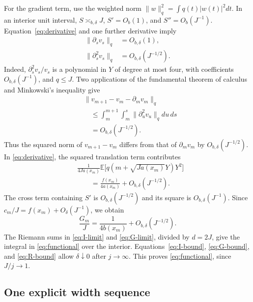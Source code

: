 \documentclass[aps,pra,reprint,superscriptaddress,longbibliography]{revtex4-2}
\theoremstyle{remark}
\newcommand{\E}{\mathbb E}
\newcommand{\norm}[1]{\lVert#1\rVert}
\begin{document}
For the gradient term, use the weighted norm
$\norm w_q^2=\int q(t)|w(t)|^2dt$. In an interior unit interval,
$S\asymp_{b,\delta}J$, $S'=O_b(1)$, and $S''=O_b(J^{-1})$.
Equation~\eqref{eq:derivative} and one further derivative imply
\begin{equation}
\begin{aligned}
\norm{\partial_sv_s}_q&=O_{b,\delta}(1),\\
\norm{\partial_s^2v_s}_q&=O_{b,\delta}(J^{-1/2}).
\end{aligned}
\label{eq:H2}
\end{equation}
Indeed, $\partial_s^2v_s/v_s$ is a polynomial in $Y$ of degree at
most four, with coefficients $O_{b,\delta}(J^{-1})$, and $q\leq J$.
Two applications of the fundamental theorem of calculus and
Minkowski's inequality give
\begin{equation}
\begin{aligned}
&\norm{v_{m+1}-v_m-\partial_mv_m}_q\\
&\quad\leq\int_m^{m+1}\int_m^s
\norm{\partial_u^2v_u}_qdu\,ds\\
&\quad=O_{b,\delta}(J^{-1/2}).
\end{aligned}
\label{eq:finite-diff}
\end{equation}
Thus the squared norm of $v_{m+1}-v_m$ differs from that of
$\partial_mv_m$ by $O_{b,\delta}(J^{-1/2})$.
In \eqref{eq:derivative}, the squared translation term contributes
\begin{align*}
 &\frac1{4Ja(x_m)}\E\bigl[q(m+\sqrt{Ja(x_m)}Y)Y^2\bigr]\\
 &\qquad=\frac{f(x_m)}{4a(x_m)}+O_{b,\delta}(J^{-1/2}).
\end{align*}
The cross term containing $S'$ is $O_{b,\delta}(J^{-1/2})$ and its
square is $O_{b,\delta}(J^{-1})$. Since
$c_m/J=f(x_m)+O_\delta(J^{-1})$, we obtain
\begin{equation}
 \frac{G_m}{J}=\frac1{4b(x_m)}+O_{b,\delta}(J^{-1/2}).
 \label{eq:G-limit}
\end{equation}
The Riemann sums in \eqref{eq:I-limit} and \eqref{eq:G-limit},
divided by $d=2J$, give the integral in \eqref{eq:functional} over
the interior. Equations~\eqref{eq:I-bound}, \eqref{eq:G-bound}, and
\eqref{eq:R-bound} allow $\delta\downarrow0$ after $j\to\infty$.
This proves \eqref{eq:functional}, since $J/j\to1$.

\subsection{One explicit width sequence}
\end{document}
